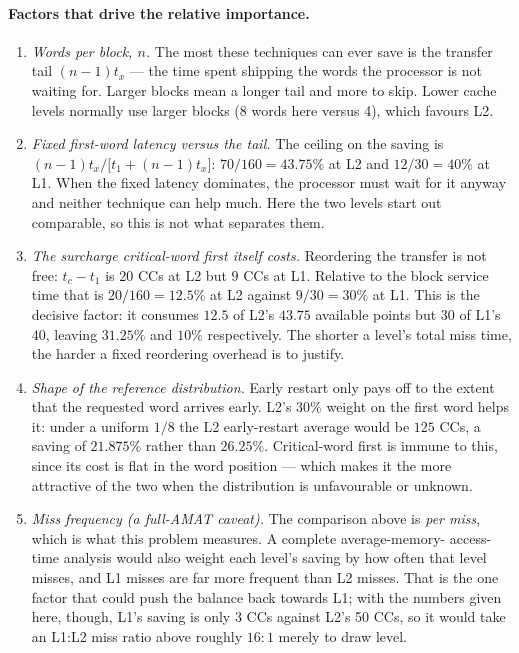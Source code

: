 \paragraph{Factors that drive the relative importance.}
\begin{enumerate}\itemsep3pt
  \item \emph{Words per block, $n$.} The most these techniques can ever save is the
        transfer tail $(n-1)t_x$ --- the time spent shipping the words the processor is
        not waiting for. Larger blocks mean a longer tail and more to skip. Lower cache
        levels normally use larger blocks (8 words here versus 4), which favours L2.
  \item \emph{Fixed first-word latency versus the tail.} The ceiling on the saving is
        $(n-1)t_x/\bigl[t_1+(n-1)t_x\bigr]$: $70/160=43.75\%$ at L2 and $12/30=40\%$ at
        L1. When the fixed latency dominates, the processor must wait for it anyway and
        neither technique can help much. Here the two levels start out comparable, so
        this is not what separates them.
  \item \emph{The surcharge critical-word first itself costs.} Reordering the transfer
        is not free: $t_c-t_1$ is $20$ CCs at L2 but $9$ CCs at L1. Relative to the
        block service time that is $20/160=12.5\%$ at L2 against $9/30=30\%$ at L1. This
        is the decisive factor: it consumes $12.5$ of L2's $43.75$ available points but
        $30$ of L1's $40$, leaving $31.25\%$ and $10\%$ respectively. The shorter a
        level's total miss time, the harder a fixed reordering overhead is to justify.
  \item \emph{Shape of the reference distribution.} Early restart only pays off to the
        extent that the requested word arrives early. L2's $30\%$ weight on the first
        word helps it: under a uniform $1/8$ the L2 early-restart average would be
        $125$ CCs, a saving of $21.875\%$ rather than $26.25\%$. Critical-word first is
        immune to this, since its cost is flat in the word position --- which makes it
        the more attractive of the two when the distribution is unfavourable or unknown.
  \item \emph{Miss frequency (a full-AMAT caveat).} The comparison above is
        \emph{per miss}, which is what this problem measures. A complete average-memory-
        access-time analysis would also weight each level's saving by how often that
        level misses, and L1 misses are far more frequent than L2 misses. That is the
        one factor that could push the balance back towards L1; with the numbers given
        here, though, L1's saving is only 3 CCs against L2's 50 CCs, so it would take an
        L1:L2 miss ratio above roughly $16{:}1$ merely to draw level.
\end{enumerate}
